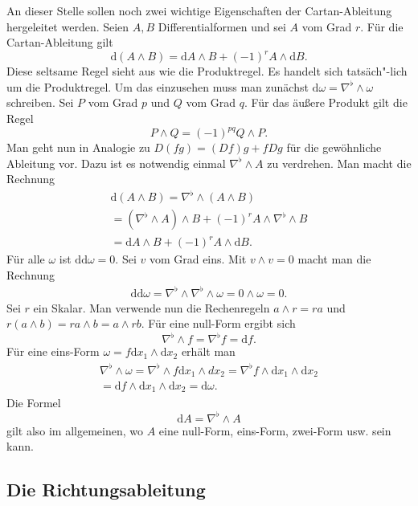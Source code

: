 \documentclass[a4paper,10pt,fleqn,twocolumn,twoside]{article}
\begin{document}
An dieser Stelle sollen noch zwei wichtige Eigenschaften der
Cartan-Ableitung hergeleitet werden. Seien $A,B$ Differentialformen
und sei $A$ vom Grad $r$. Für die Cartan-Ableitung gilt
\[\mathrm d(A\wedge B)
= \mathrm dA\wedge B + (-1)^r A\wedge \mathrm dB.\]
Diese seltsame Regel sieht aus wie die Produktregel. Es handelt
sich tatsäch"-lich um die Produktregel. Um das einzusehen muss man
zunächst $\mathrm d\omega = \nabla^\flat\wedge\omega$ schreiben.
Sei $P$ vom Grad $p$ und $Q$ vom Grad $q$. Für das
äußere Produkt gilt die Regel
\[P\wedge Q = (-1)^{pq}Q\wedge P.\]
Man geht nun in Analogie zu $D(fg)=(Df)g+fDg$ für die gewöhnliche
Ableitung vor. Dazu ist es notwendig einmal $\nabla^\flat\wedge A$
zu verdrehen. Man macht die Rechnung
\begin{gather*}
\mathrm d(A\wedge B) = \nabla^\flat\wedge (A\wedge B)\\
= (\nabla^\flat\wedge A)\wedge B
+ (-1)^r A\wedge\nabla^\flat\wedge B\\
= \mathrm dA\wedge B + (-1)^r A\wedge \mathrm dB.
\end{gather*}
Für alle $\omega$ ist $\mathrm {dd}\omega=0$.
Sei $v$ vom Grad eins.
Mit $v\wedge v=0$ macht man die Rechnung
\begin{gather*}
\mathrm{dd}\omega
= \nabla^\flat\wedge\nabla^\flat\wedge\omega
= 0\wedge\omega = 0.
\end{gather*}
Sei $r$ ein Skalar. Man verwende nun die Rechenregeln $a\wedge r=ra$ und
$r(a\wedge b) = ra\wedge b = a\wedge rb$. Für eine null-Form ergibt sich
\[\nabla^\flat\wedge f = \nabla^\flat f = \mathrm df.\]
Für eine eins-Form $\omega = f\mathrm dx_1\wedge\mathrm dx_2$
erhält man
\begin{gather*}
\nabla^\flat\wedge\omega = \nabla^\flat\wedge f\mathrm dx_1\wedge dx_2
= \nabla^\flat f\wedge\mathrm dx_1\wedge\mathrm dx_2\\
= \mathrm df\wedge\mathrm dx_1\wedge\mathrm dx_2
= \mathrm d\omega.
\end{gather*}
Die Formel
\[\mathrm dA = \nabla^\flat\wedge A\]
gilt also im allgemeinen, wo $A$ eine null-Form, eins-Form,
zwei-Form usw. sein kann.

\subsection{Die Richtungsableitung}
\end{document}
